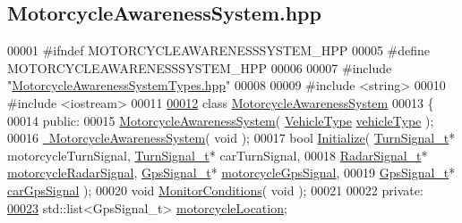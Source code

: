 \hypertarget{MotorcycleAwarenessSystem_8hpp_source}{\subsection{Motorcycle\-Awareness\-System.\-hpp}
}

\begin{DoxyCode}
00001 \textcolor{preprocessor}{#ifndef MOTORCYCLEAWARENESSSYSTEM\_HPP}
00005 \textcolor{preprocessor}{}\textcolor{preprocessor}{#define MOTORCYCLEAWARENESSSYSTEM\_HPP}
00006 \textcolor{preprocessor}{}
00007 \textcolor{preprocessor}{#include "\hyperlink{MotorcycleAwarenessSystemTypes_8hpp}{MotorcycleAwarenessSystemTypes.hpp}"}
00008 
00009 \textcolor{preprocessor}{#include <string>}
00010 \textcolor{preprocessor}{#include <iostream>}
00011 
\hypertarget{MotorcycleAwarenessSystem_8hpp_source_l00012}{}\hyperlink{classMotorcycleAwarenessSystem}{00012} \textcolor{keyword}{class }\hyperlink{classMotorcycleAwarenessSystem}{MotorcycleAwarenessSystem}
00013 \{
00014     \textcolor{keyword}{public}:
00015         \hyperlink{classMotorcycleAwarenessSystem_ab0fb3823809dc056fecc82cc72a80a55}{MotorcycleAwarenessSystem}( \hyperlink{MotorcycleAwarenessSystemTypes_8hpp_a0c05c42b98a847f971385c81c2a81afa}{VehicleType} 
      \hyperlink{classMotorcycleAwarenessSystem_a977b2085bfbf6a62902bf2d80160e6d2}{vehicleType} );
00016         \hyperlink{classMotorcycleAwarenessSystem_a89ce16a722b3575e1415cbe9c7eedbd3}{~MotorcycleAwarenessSystem}( \textcolor{keywordtype}{void} );
00017         \textcolor{keywordtype}{bool} \hyperlink{classMotorcycleAwarenessSystem_a341f27867c8d6aa0865040279ee246a9}{Initialize}( \hyperlink{structTurnSignal__t}{TurnSignal\_t}* motorcycleTurnSignal, 
      \hyperlink{structTurnSignal__t}{TurnSignal\_t}* carTurnSignal,
00018                          \hyperlink{structRadarSignal__t}{RadarSignal\_t}* \hyperlink{classMotorcycleAwarenessSystem_a0744e71b9f440a86f5078c876ba7629b}{motorcycleRadarSignal}, 
      \hyperlink{structGpsSignal__t}{GpsSignal\_t}* \hyperlink{classMotorcycleAwarenessSystem_ab281a3993b574923b2f379ed0477b2d4}{motorcycleGpsSignal},
00019                          \hyperlink{structGpsSignal__t}{GpsSignal\_t}* \hyperlink{classMotorcycleAwarenessSystem_a9a8185e00b60d0be58bfa76166063128}{carGpsSignal} );
00020         \textcolor{keywordtype}{void} \hyperlink{classMotorcycleAwarenessSystem_afb19e832c17d43941d9ed6c4f4435a2e}{MonitorConditions}( \textcolor{keywordtype}{void} );
00021 
00022     \textcolor{keyword}{private}:
\hypertarget{MotorcycleAwarenessSystem_8hpp_source_l00023}{}\hyperlink{classMotorcycleAwarenessSystem_af6becfeb1d11b467cb80a94a8e6940ac}{00023}         std::list<GpsSignal\_t> \hyperlink{classMotorcycleAwarenessSystem_af6becfeb1d11b467cb80a94a8e6940ac}{motorcycleLocation}; 

\end{DoxyCode}
